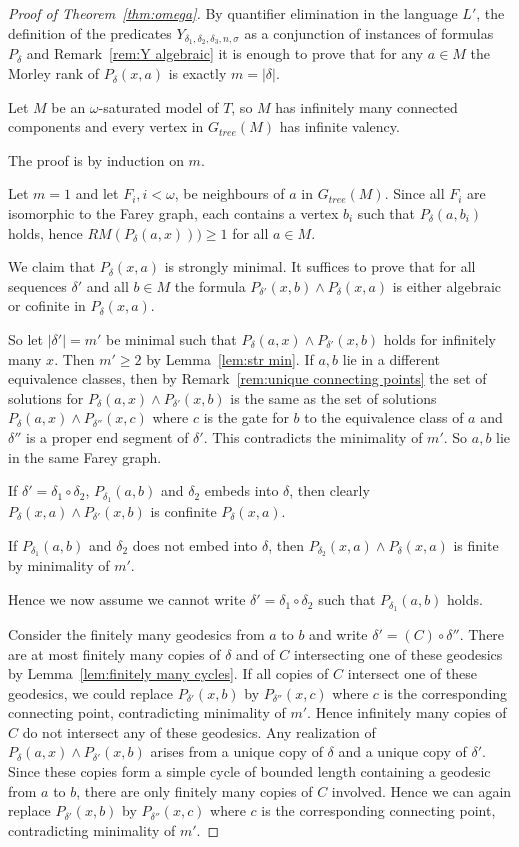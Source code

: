 \documentclass[10pt,a4paper]{amsart}
\renewcommand{\d}{\delta}
\begin{document}
 \begin{proof}[Proof of Theorem~\ref{thm:omega}]


By quantifier elimination in the language $L'$, the definition of the predicates $Y_{\delta_1, \delta_2, \delta_3, n, \sigma}$ as a conjunction of instances of formulas $P_\delta$ and Remark~\ref{rem:Y algebraic} it is enough to prove that for any $a\in M$ the Morley rank of     $P_\delta(x,a)$ is exactly $m=|\delta|$. 

    Let $M$ be an $\omega$-saturated model of $T$, so $M$ has infinitely many connected components and every vertex in $G_{tree}(M)$ has infinite valency.

The proof is by 
 induction on $m$.  

\bigskip

Let $m=1$ and  let $F_i, i<\omega$, be  neighbours of $a$ in $G_{tree}(M)$. Since all $F_i$ are isomorphic to the Farey graph, each contains a vertex $b_i$ such that $P_\d(a, b_i)$ holds, hence  $RM(P_\d(a, x)) ) \geq 1$ for all $a\in M$.

We claim that $P_\d(x,a)$ is strongly minimal. It suffices to prove that for all sequences $\d'$ and all $b\in M$ the formula $P_{\d'}(x,b)\wedge P_\d(x,a)$ is either algebraic or cofinite in $P_\d(x,a)$.

So let $|\d'|=m'$ be minimal such that $P_\d(a,x)\wedge P_{\d'}(x,b)$ holds for infinitely many $x$. Then $m'\geq 2$ by Lemma~\ref{lem:str min}.
If $a, b$ lie in a different equivalence classes, then by Remark~\ref{rem:unique connecting points} the set of solutions for $P_\d(a,x)\wedge P_{\d'}(x,b)$ is the same as the set of solutions $P_\d(a,x)\wedge P_{\d''}(x,c)$ where $c$ is the gate for $b$ to the equivalence class of $a$ and $\d''$ is a proper end segment of $\d'$. This contradicts the minimality of $m'$. So $a, b$ lie in the same Farey graph.

If $\d'=\d_1\circ\d_2$, $P_{\d_1}(a,b)$ and $\d_2$ embeds into $\d$, then clearly $P_\d(x,a)\wedge P_{\d'}(x,b)$ is confinite $P_\d(x,a)$. 

If $P_{\d_1}(a,b)$ and $\d_2$ does not embed into $\d$, then $P_{\d_2}(x,a)\wedge P_\d(x,a)$ is finite by minimality of $m'$. 

Hence we now assume we cannot write $\d'=\d_1\circ\d_2$ such that $P_{\d_1}(a,b)$ holds.

Consider the finitely many geodesics from $a$ to $b$ and write $\d'=(C)\circ\d''$. 
There are at most  finitely many copies of $\d$ and of $C$ intersecting one of these geodesics by Lemma~\ref{lem:finitely many cycles}. 
If all copies of $C$ intersect one of these geodesics, we could replace $P_{\d'}(x,b)$ by $P_{\d''}(x,c)$ where $c$ is the corresponding connecting point, contradicting minimality of $m'$.
Hence infinitely many copies of $C$ do not intersect any of these geodesics.
Any realization of $P_\d(a,x)\wedge P_{\d'}(x,b)$ arises from a unique copy of $\d$ and a unique copy of $\d'$. Since these copies form a simple cycle of bounded length containing a geodesic from $a$ to $b$, there are only finitely many copies of $C$ involved. Hence we can again replace $P_{\d'}(x,b)$ by $P_{\d''}(x,c)$ where $c$ is the corresponding connecting point, contradicting minimality of $m'$.


\end{proof}
\end{document}
